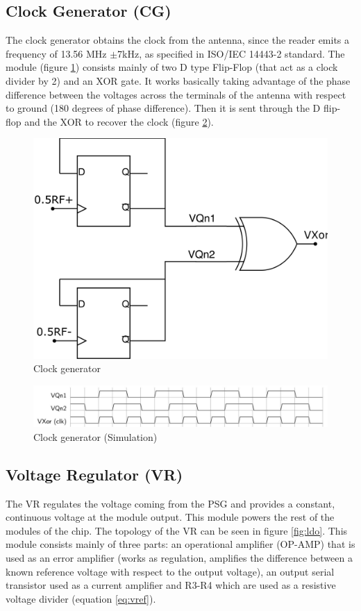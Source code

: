 \documentclass{article} %
\begin{document}
\begin{multicols}{2}
\subsection{Clock Generator (CG)}
The clock generator obtains the clock from the antenna, since the reader emits a frequency of 13.56 MHz $\pm$7kHz, as specified in ISO/IEC 14443-2 standard. The module (figure  \ref{fig:clock_gen}) consists mainly of two D type Flip-Flop (that act as a clock divider by 2) and an XOR gate.
It works basically taking advantage of the phase difference between the voltages across the terminals of the antenna with respect to ground (180 degrees of phase difference). Then it is sent through the D flip-flop and the XOR to recover the clock (figure 
\ref{fig:clock_gen_sim}).
\begin{figure}[H]
\centering
\includegraphics[width=0.5\linewidth]{Images/ImagenesTesina/circuitos/CLK.png}
\caption{Clock generator}
\label{fig:clock_gen}
\end{figure}

\begin{figure}[H]
\centering
\includegraphics[width=0.9\linewidth]{Images/ImagenesTesina/circuitos/clk_sim.png}
\caption{Clock generator (Simulation)}
\label{fig:clock_gen_sim}
\end{figure}

\subsection{Voltage Regulator (VR)}
The VR regulates the voltage coming from the PSG and provides a constant, continuous voltage at the module output. This module powers the rest of the modules of the chip. The topology of the VR can be seen in figure \ref{fig:ldo}. This module consists mainly of three parts: an operational amplifier (OP-AMP) that is used as an error amplifier (works as regulation, amplifies the difference between a known reference voltage with respect to the output voltage), an output serial transistor used as a current amplifier and R3-R4 which are used as a resistive voltage divider (equation \ref{eq:vref}).  


\end{multicols}
\end{document}
